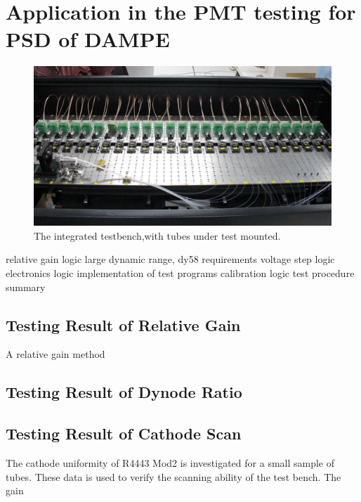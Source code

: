 \documentclass[5p, times]{elsarticle}
\begin{document}
\section{Application in the PMT testing for PSD of DAMPE}
\label{sec:application}

\begin{figure}[t]
 \centering
 \includegraphics[width=140mm]{integration1_crop}
\caption{The integrated testbench,with tubes under test mounted.}
\label{fig:testbench_integrated}
\end{figure}

relative gain logic
large dynamic range, dy58 requirements
voltage step logic
electronics logic
implementation of test programs
calibration logic
test procedure summary

\subsection{Testing Result of Relative Gain}
\label{sec:psd_gain}

A relative gain method 


\subsection{Testing Result of Dynode Ratio}
\label{sec:psd_dy58}



\subsection{Testing Result of Cathode Scan}
\label{sec:psd_cathodescan}

The cathode uniformity of R4443 Mod2 is investigated for a small sample of tubes.
These data is used to verify the scanning ability of the test bench.
The gain
\end{document}
